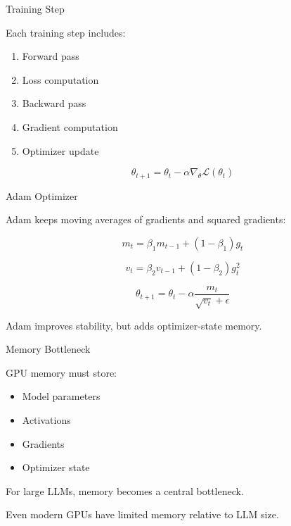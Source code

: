 \documentclass[aspectratio=169]{beamer}
\begin{document}
\begin{frame}{Training Step}

Each training step includes:

\begin{enumerate}
    \item Forward pass
    \item Loss computation
    \item Backward pass
    \item Gradient computation
    \item Optimizer update
\end{enumerate}

\vspace{0.5cm}

\[
\theta_{t+1}
=
\theta_t
-
\alpha \nabla_{\theta}\mathcal{L}(\theta_t)
\]

\end{frame}

\begin{frame}{Adam Optimizer}

Adam keeps moving averages of gradients and squared gradients:

\[
m_t
=
\beta_1 m_{t-1}
+
(1-\beta_1)g_t
\]

\[
v_t
=
\beta_2 v_{t-1}
+
(1-\beta_2)g_t^2
\]

\[
\theta_{t+1}
=
\theta_t
-
\alpha
\frac{m_t}{\sqrt{v_t}+\epsilon}
\]

\vspace{0.4cm}

Adam improves stability, but adds optimizer-state memory.

\end{frame}

\begin{frame}{Memory Bottleneck}

GPU memory must store:

\begin{itemize}
    \item Model parameters
    \item Activations
    \item Gradients
    \item Optimizer state
\end{itemize}

\vspace{0.5cm}

For large LLMs, memory becomes a central bottleneck.

\vspace{0.4cm}

Even modern GPUs have limited memory relative to LLM size.

\end{frame}
\end{document}
